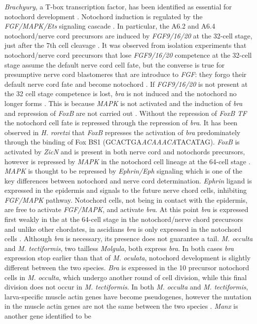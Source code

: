 \textit{Brachyury}, a T-box transcription factor, has been identified as essential for notochord development \cite{yasuo_conservation_1998}. Notochord induction is regulated by the \textit{FGF/MAPK/Ets} signaling cascade \cite{minokawa_binary_2001}. In particular, the A6.2 and A6.4 notochord/nerve cord precursors are induced by \textit{FGF9/16/20} at the 32-cell stage, just after the 7th cell cleavage \cite{satoh_ascidian_2001}. It was observed from isolation experiments that notochord/nerve cord precursors that lose \textit{FGF9/16/20} competence at the 32-cell stage assume the default nerve cord cell fate, but the converse is true for presumptive nerve cord blastomeres that are introduce to \textit{FGF}: they forgo their default nerve cord fate and become notochord \cite{yasuo_conservation_1998,minokawa_binary_2001}. If \textit{FGF9/16/20} is not present at the 32 cell stage competence is lost, \textit{bra} is not induced and the notochord no longer forms \cite{nakatani_basic_1996,nakatani_duration_1999}. This is because \textit{MAPK} is not activated and the induction of \textit{bra} and repression of \textit{FoxB} are not carried out \cite{hashimoto_transcription_2011}. Without the repression of \textit{FoxB TF} the notochord cell fate is repressed through the repression of \textit{bra}. It has been observed in \textit{H. roretzi} that \textit{FoxB} represses the activation of \textit{bra} predominately through the binding of Fox BS1 (GCACTGA\textit{ACAAACA}TACATAG). \textit{FoxB} is activated by \textit{ZicN} and is present in both nerve cord and notochords precursors, however is repressed by \textit{MAPK} in the notochord cell lineage at the 64-cell stage \cite{hashimoto_transcription_2011}. \textit{MAPK} is thought to be repressed by \textit{Ephrin/Eph} signaling which is one of the key differences between notochord and nerve cord determination. \textit{Ephrin} ligand is expressed in the epidermis and signals to the future nerve chord cells, inhibiting \textit{FGF/MAPK} pathway. Notochord cells, not being in contact with the epidermis, are free to activate \textit{FGF/MAPK}, and activate \textit{bra}. At this point \textit{bra} is expressed first weakly in the at the 64-cell stage in the notochord/nerve chord precursors \cite{yasuo_ascidian_1994} and unlike other chordates, in ascidians \textit{bra} is only expressed in the notochord cells \cite{yasuo_function_1993,corbo_characterization_1997,hotta_temporal_1999,takada_brachyury_2002}. Although \textit{bra} is necessary, its presence does not guarantee a tail. \textit{M. occulta} and \textit{M. tectiformis}, two tailless \textit{Molgula}, both express \textit{bra}. In both cases \textit{bra} expression stop earlier than that of \textit{M. oculata}, notochord development is slightly different between the two species. \textit{Bra} is expressed in the 10 precursor notochord cells in \textit{M. occulta}, which undergo another round of cell division, while this final division does not occur in \textit{M. tectiformis}.  In  both \textit{M. occulta} and \textit{M. tectiformis}, larva-specific muscle actin genes have become pseudogenes, however the mutation in the muscle actin genes are not the same between the two species  \cite{swalla_novel_1993,jeffery_evolution_1999}. \textit{Manx} is another gene identified to be 